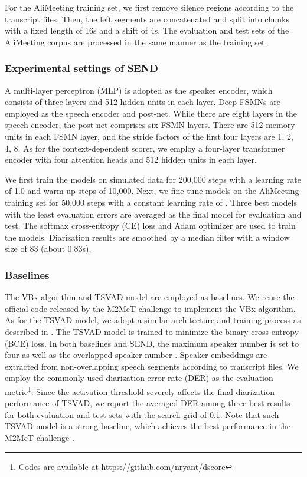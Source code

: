 \documentclass[a4paper]{article}
\begin{document}
For the AliMeeting training set, we first remove silence regions according to the transcript files. Then, the left segments are concatenated and split into chunks with a fixed length of 16s and a shift of 4s. The evaluation and test sets of the AliMeeting corpus are processed in the same manner as the training set.
\subsubsection{Experimental settings of SEND}
A multi-layer perceptron (MLP) is adopted as the speaker encoder, which consists of three layers and 512 hidden units in each layer.
Deep FSMNs are employed as the speech encoder and post-net.
While there are eight layers in the speech encoder, the post-net comprises six FSMN layers.
There are 512 memory units in each FSMN layer, and the stride factors of the first four layers are 1, 2, 4, 8.
As for the context-dependent scorer, we employ a four-layer transformer encoder with four attention heads and 512 hidden units in each layer.

We first train the models on simulated data for 200,000 steps with a learning rate of 1.0 and warm-up steps of 10,000.
Next, we fine-tune models on the AliMeeting training set for 50,000 steps with a constant learning rate of . Three best models with the least evaluation errors are averaged as the final model for evaluation and test.
The softmax cross-entropy (CE) loss and Adam optimizer \cite{KingmaB14} are used to train the models.
Diarization results are smoothed by a median filter with a window size of 83 (about 0.83s).

\subsubsection{Baselines}
The VBx algorithm \cite{landini2022bayesian} and TSVAD model \cite{MedennikovKPKKS20} are employed as baselines.
We reuse the official code released by the M2MeT challenge \cite{FanYu2022} to implement the VBx algorithm.
As for the TSVAD model, we adopt a similar architecture and training process as described in \cite{Weiqing2022}. 
The TSVAD model is trained to minimize the binary cross-entropy (BCE) loss.
In both baselines and SEND, the maximum speaker number  is set to four as well as the overlapped speaker number .
Speaker embeddings are extracted from non-overlapping speech segments according to transcript files.
We employ the commonly-used diarization error rate (DER) as the evaluation metric\footnote{Codes are available at https://github.com/nryant/dscore}.
Since the activation threshold severely affects the final diarization performance of TSVAD, we report the averaged DER among three best results for both evaluation and test sets with the search grid of 0.1. Note that such TSVAD model is a strong baseline, which achieves the best performance in the M2MeT challenge \cite{Yu2022Summary}.
\end{document}
